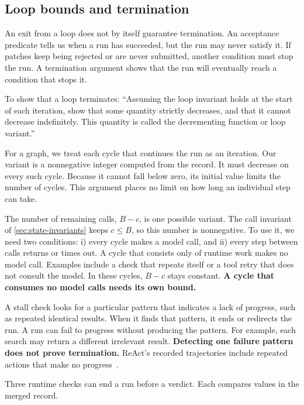 \subsection{Loop bounds and termination}
\label{sec:control-bounds}

An exit from a loop does not by itself guarantee termination. An acceptance predicate tells us
when a run has succeeded, but the run may never satisfy it. If patches keep being rejected or are
never submitted, another condition must stop the run. A termination argument shows that the run
will eventually reach a condition that stops it.

\begin{definition}[Variant]
\label{def:variant}
To show that a loop terminates: ``Assuming the loop invariant holds at the start of each iteration,
show that some quantity strictly decreases, and that it cannot decrease indefinitely. This quantity
is called the decrementing function or loop variant.''~\citep{cornell-cs2112-loopinv}
\end{definition}

For a graph, we treat each cycle that continues the run as an iteration. Our variant is a
nonnegative integer computed from the record. It must decrease on every such cycle. Because it
cannot fall below zero, its initial value limits the number of cycles. This argument places no
limit on how long an individual step can take.

The number of remaining calls, $B - c$, is one possible variant. The call invariant of
\cref{sec:state-invariants} keeps $c \leq B$, so this number is nonnegative. To use it, we need two
conditions: i) every cycle makes a model call, and ii) every step between calls returns or times
out. A cycle that consists only of runtime work makes no model call. Examples include a check
that repeats itself or a tool retry that does not consult the model. In these cycles, $B - c$
stays constant. \textbf{A cycle that consumes no model calls needs its own bound.}

A stall check looks for a particular pattern that indicates a lack of progress, such as repeated
identical results. When it finds that pattern, it ends or redirects the run. A run can fail to
progress without producing the pattern.
For example, each search may return a different irrelevant result. \textbf{Detecting one failure
pattern does not prove termination.} ReAct's recorded trajectories include repeated actions that
make no progress~\citep[\S3.3]{yao2023react}.

Three runtime checks can end a run before a verdict. Each compares values in the merged record.

